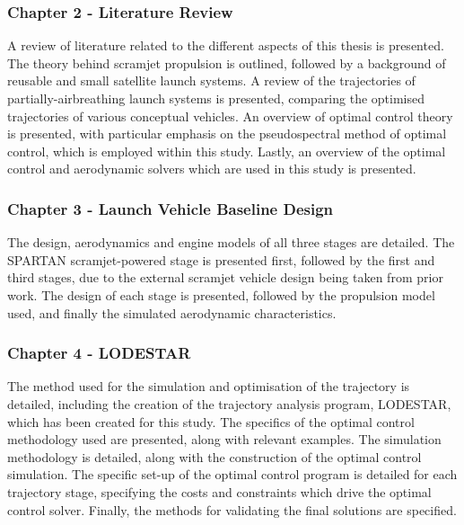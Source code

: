     

    \subsubsection*{Chapter 2 - Literature Review}

      A review of literature related to the different aspects of this thesis is presented. The theory behind scramjet propulsion is outlined, followed by a background of reusable and small satellite launch systems. A review of the trajectories of partially-airbreathing launch systems is presented, comparing the optimised trajectories of various conceptual vehicles. An overview of optimal control theory is presented, with particular emphasis on the pseudospectral method of optimal control, which is employed within this study. Lastly, an overview of the optimal control and aerodynamic solvers which are used in this study is presented.
      

    \subsubsection*{Chapter 3 - Launch Vehicle Baseline Design}

      The design, aerodynamics and engine models of all three stages are detailed. The SPARTAN scramjet-powered stage is presented first, followed by the first and third stages, due to the external scramjet vehicle design being taken from prior work. The design of each stage is presented, followed by the propulsion model used, and finally the simulated aerodynamic characteristics. 
      
      
      \subsubsection*{Chapter 4 - LODESTAR}
      
      The method used for the simulation and optimisation of the trajectory is detailed, including the creation of the trajectory analysis program, LODESTAR, which has been created for this study. The specifics of the optimal control methodology used are presented, along with relevant examples. The simulation methodology is detailed, along with the construction of the optimal control simulation. The specific set-up of the optimal control program is detailed for each trajectory stage, specifying the costs and constraints which drive the optimal control solver. Finally, the methods for validating the final solutions are specified.
      
